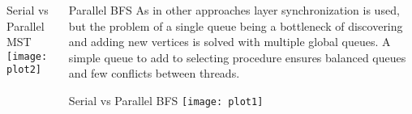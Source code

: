\documentclass[serif,mathserif,final]{beamer}
\begin{document}
\begin{frame}{}
\begin{columns}[t]
\begin{column}{0.32\linewidth}
      \begin{block}{Serial vs Parallel MST}
          \texttt{[image: plot2]}
      \end{block}

    \end{column}%

    \begin{column}{0.32\linewidth}

      
            \begin{block}{Parallel BFS}
        As in other approaches layer synchronization is used, but the problem of a single queue being a bottleneck of discovering and adding new vertices is solved with multiple global queues. A simple queue to add to selecting procedure ensures balanced queues and few conflicts between threads.
      \end{block}

      \begin{block}{Serial vs Parallel BFS}
          \texttt{[image: plot1]}
      \end{block}
    \end{column}%

  \end{columns}
\end{frame}
\end{document}
